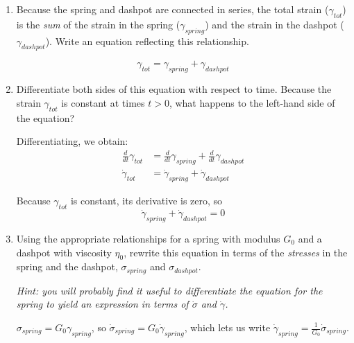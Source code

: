 \begin{activity}
\begin{exercises}
			\begin{enumerate}
					
				\item Because the spring and dashpot are connected in series, the total strain ($\gamma_{tot}$) is the \emph{sum} of the strain in the spring ($\gamma_{spring}$) and the strain in the dashpot ($\gamma_{dashpot}$).  Write an equation reflecting this relationship.
				
					\begin{solution}
						\begin{equation*}
							\gamma_{tot} = \gamma_{spring} + \gamma_{dashpot}
						\end{equation*}
					\end{solution}
					
				\item Differentiate both sides of this equation with respect to time.  Because the strain $\gamma_{tot}$ is constant at times $t>0$, what happens to the left-hand side of the equation?
				
					\begin{solution}
						Differentiating, we obtain:					
						\begin{align*}
							\frac{d}{dt}\gamma_{tot} &= \frac{d}{dt}\gamma_{spring} + \frac{d}{dt}\gamma_{dashpot}\\
							\dot\gamma_{tot} &= \dot\gamma_{spring} + \dot\gamma_{dashpot}
						\end{align*}
						
						Because $\gamma_{tot}$ is constant, its derivative is zero, so
						\begin{equation*}
							\dot\gamma_{spring} + \dot\gamma_{dashpot} = 0
						\end{equation*}
					\end{solution}
				
				\item Using the appropriate relationships for a spring with modulus $G_0$ and a dashpot with viscosity $\eta_0$, rewrite this equation in terms of the \emph{stresses} in the spring and the dashpot, $\sigma_{spring}$ and $\sigma_{dashpot}$.
				
					\emph{Hint: you will probably find it useful to differentiate the equation for the spring to yield an expression in terms of $\dot\sigma$ and $\dot\gamma$.}
				
					\begin{solution}
						$\sigma_{spring} = G_0 \gamma_{spring}$, so $\dot\sigma_{spring} = G_0 \dot\gamma_{spring}$, which lets us write $\dot\gamma_{spring} = \frac{1}{G_0}\dot\sigma_{spring}$.
						

\end{solution}
\end{enumerate}
\end{exercises}
\end{activity}
